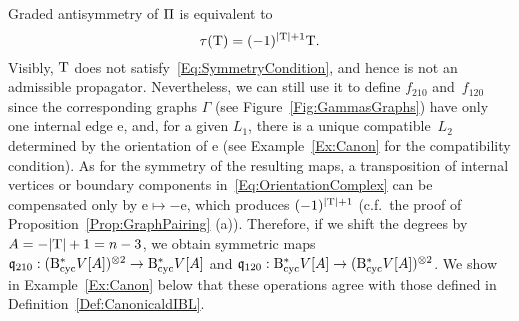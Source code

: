\documentclass[\MainFolder/Text.tex]{subfiles}
\begin{document}
Graded antisymmetry of $\Pi$ is equivalent to 
\[ \tau(\mathrm{T})= (-1)^{|\mathrm{T}|+1}\mathrm{T}. \]
Visibly, $\mathrm{T}$ does not satisfy~\eqref{Eq:SymmetryCondition}, and hence is not an admissible propagator. Nevertheless, we can still use it to define $f_{210}$ and~$f_{120}$ since the corresponding graphs $\Gamma$ (see Figure~\ref{Fig:GammasGraphs}) have only one internal edge $\mathrm{e}$, and, for a given $L_1$, there is a unique compatible~$L_2$ determined by the orientation of $\mathrm{e}$ (see Example~\ref{Ex:Canon} for the compatibility condition). As for the symmetry of the resulting maps, a transposition of internal vertices or boundary components in~\eqref{Eq:OrientationComplex} can be compensated only by $\mathrm{e}\mapsto-\mathrm{e}$, which produces $(-1)^{|\mathrm{T}|+1}$ (c.f.~the proof of Proposition~\ref{Prop:GraphPairing} (a)). Therefore, if we shift the degrees by $A= - |\mathrm{T}| +  1 = n- 3$, we obtain symmetric maps $\mathfrak{q}_{210}: (\mathrm{B}_{\mathrm{cyc}}^* V[A])^{\otimes 2} \rightarrow \mathrm{B}_{\mathrm{cyc}}^* V[A]$ and $\mathfrak{q}_{120}: \mathrm{B}_{\mathrm{cyc}}^* V[A] \rightarrow (\mathrm{B}_{\mathrm{cyc}}^* V[A])^{\otimes 2}$. We show in Example~\ref{Ex:Canon} below that these operations agree with those defined in Definition~\ref{Def:CanonicaldIBL}.
\end{document}
